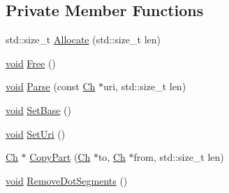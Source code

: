\subsection*{Private Member Functions}
\begin{DoxyCompactItemize}
\item 
std\+::size\+\_\+t \hyperlink{classGenericUri_a408da6c9ee1bdbc8502ea9bcabf6ab72}{Allocate} (std\+::size\+\_\+t len)
\item 
\hyperlink{imgui__impl__opengl3__loader_8h_ac668e7cffd9e2e9cfee428b9b2f34fa7}{void} \hyperlink{classGenericUri_adf9b1230a24c35979fb6d2ce4ba0a705}{Free} ()
\item 
\hyperlink{imgui__impl__opengl3__loader_8h_ac668e7cffd9e2e9cfee428b9b2f34fa7}{void} \hyperlink{classGenericUri_a8e1b49e53460e21b8aebfdf203d985d6}{Parse} (const \hyperlink{classGenericUri_a20d0602cff62211d89bc4b25963beeee}{Ch} $\ast$uri, std\+::size\+\_\+t len)
\item 
\hyperlink{imgui__impl__opengl3__loader_8h_ac668e7cffd9e2e9cfee428b9b2f34fa7}{void} \hyperlink{classGenericUri_ad367483b60312ed435f952ad18da1650}{Set\+Base} ()
\item 
\hyperlink{imgui__impl__opengl3__loader_8h_ac668e7cffd9e2e9cfee428b9b2f34fa7}{void} \hyperlink{classGenericUri_a23fa250dbf260506ca9137de13a56361}{Set\+Uri} ()
\item 
\hyperlink{classGenericUri_a20d0602cff62211d89bc4b25963beeee}{Ch} $\ast$ \hyperlink{classGenericUri_a418f26d11faf27ccdcf3e354abf82be7}{Copy\+Part} (\hyperlink{classGenericUri_a20d0602cff62211d89bc4b25963beeee}{Ch} $\ast$to, \hyperlink{classGenericUri_a20d0602cff62211d89bc4b25963beeee}{Ch} $\ast$from, std\+::size\+\_\+t len)
\item 
\hyperlink{imgui__impl__opengl3__loader_8h_ac668e7cffd9e2e9cfee428b9b2f34fa7}{void} \hyperlink{classGenericUri_ab3eb283c9e6e004451430bd9c7580ec8}{Remove\+Dot\+Segments} ()
\end{DoxyCompactItemize}

